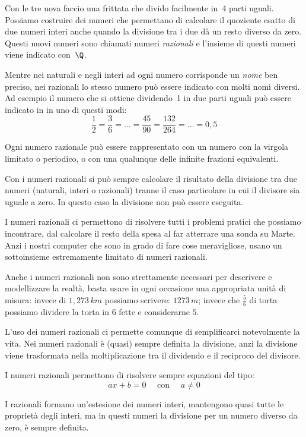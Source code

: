 Con le tre uova faccio una frittata che divido facilmente in~4 parti 
uguali. 
Possiamo costruire dei numeri che permettano di calcolare il 
quoziente esatto di due numeri interi anche quando la divisione tra i due 
dà un resto diverso da zero. 
Questi nuovi numeri sono chiamati numeri \emph{razionali} 
e l'insieme di questi numeri viene indicato con~\(\Q\).

Mentre nei naturali e negli interi ad ogni numero corrisponde un 
\emph{nome} ben preciso, nei razionali lo stesso numero può essere indicato 
con molti nomi diversi. 
Ad esempio il numero che si ottiene dividendo~1 in due parti 
uguali può essere indicato in in uno di questi modi:
\[\frac{1}{2}=\frac{3}{6}=\dots=\frac{45}{90}=\frac{132}{264}=\dots=0,5\]

Ogni numero razionale può essere rappresentato con un numero con la virgola 
limitato o periodico, o con una qualunque delle infinite frazioni equivalenti.

Con i numeri razionali si può sempre calcolare il risultato della divisione 
tra due numeri (naturali, interi o razionali) tranne il caso particolare in 
cui il divisore sia uguale a zero. 
In questo caso la divisione non può essere eseguita.

I numeri razionali ci permettono di risolvere tutti i problemi pratici che 
possiamo incontrare, dal calcolare il resto della spesa al far atterrare una 
sonda su Marte. 
Anzi i nostri computer che sono in grado di fare cose meravigliose, usano un 
sottoinsieme estremamente limitato di numeri razionali.

Anche i numeri razionali non sono strettamente necessari per descrivere e 
modellizzare la realtà, basta usare in ogni occasione una appropriata unità 
di misura: invece di \(1,273\,km\) possiamo scrivere: \(1273\,m\); 
invece che \(\frac{5}{6}\) di torta possiamo dividere la torta in \(6\) fette
e considerarne \(5\).

L'uso dei numeri razionali ci permette comunque di semplificarci 
notevolmente la vita.
Nei numeri razionali è (quasi) sempre definita la divisione, anzi la 
divisione viene trasformata nella moltiplicazione tra il dividendo e il 
reciproco del divisore.

I numeri razionali permettono di risolvere sempre equazioni del tipo:
\[ax+b=0 \quad \text{ con } \quad a \neq 0\]

I razionali formano un'estesione dei numeri interi, mantengono quasi tutte 
le proprietà degli interi, ma in questi numeri la divisione per un numero 
diverso da zero, è sempre definita.

